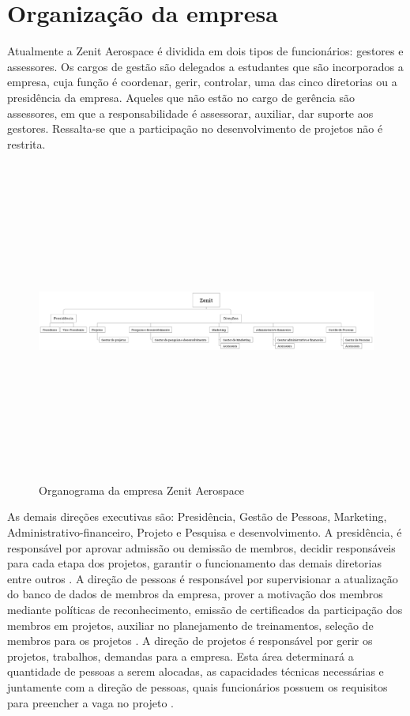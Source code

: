 \section{Organização da empresa}
Atualmente a Zenit Aerospace é dividida em dois tipos de funcionários: gestores e assessores. Os cargos de gestão são delegados a estudantes que são incorporados a empresa, cuja função é coordenar, gerir, controlar, uma das cinco diretorias ou a presidência da empresa. Aqueles que não estão no cargo de gerência são assessores, em que a responsabilidade é assessorar, auxiliar, dar suporte aos gestores. Ressalta-se que a participação no desenvolvimento de projetos não é restrita.
\begin{figure}[h]
	\centering
	\label{zenitOrganograma}
    \includegraphics[width=600pt,height=300pt,angle=90]{figuras/zenitOrganograma.eps}
	\caption{Organograma da empresa Zenit Aerospace}
\end{figure}
As demais direções executivas são: Presidência, Gestão de Pessoas, Marketing, Administrativo-financeiro, Projeto e Pesquisa e desenvolvimento.
A presidência, é responsável por aprovar admissão ou demissão de membros, decidir responsáveis para cada etapa dos projetos, garantir o funcionamento das demais diretorias entre outros \cite{regimentoZenit}. 
A direção de pessoas é responsável por supervisionar a atualização do banco de dados de membros da empresa, prover a motivação dos membros mediante políticas de reconhecimento, emissão de certificados da participação dos membros em projetos, auxiliar no planejamento de treinamentos, seleção de membros para os projetos \cite{regimentoZenit}. 
A direção de projetos é responsável por gerir os projetos, trabalhos, demandas para a empresa. Esta área determinará a quantidade de pessoas a serem alocadas, as capacidades técnicas necessárias e juntamente com a direção de pessoas, quais funcionários possuem os requisitos para preencher a vaga no projeto \cite{regimentoZenit}.


